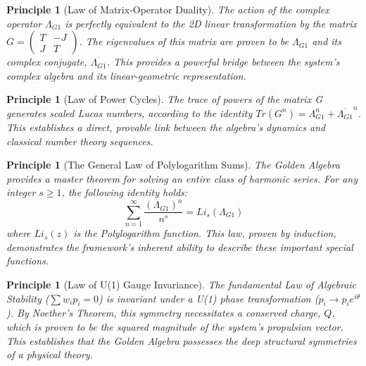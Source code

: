 \documentclass{article}
\theoremstyle{plain}
\newtheorem{principle}[theorem]{Principle}
\theoremstyle{definition}
\theoremstyle{remark}
\begin{document}
\begin{principle}[Law of Matrix-Operator Duality]
The action of the complex operator $\Lambda_{G1}$ is perfectly equivalent to the 2D linear transformation by the matrix $G = \begin{pmatrix} T & -J \\ J & T \end{pmatrix}$. The eigenvalues of this matrix are proven to be $\Lambda_{G1}$ and its complex conjugate, $\overline{\Lambda_{G1}}$. This provides a powerful bridge between the system's complex algebra and its linear-geometric representation.
\end{principle}

\begin{principle}[Law of Power Cycles]
The trace of powers of the matrix G generates scaled Lucas numbers, according to the identity $Tr(G^n) = \Lambda_{G1}^n + \overline{\Lambda_{G1}}^n$. This establishes a direct, provable link between the algebra's dynamics and classical number theory sequences.
\end{principle}

\begin{principle}[The General Law of Polylogarithm Sums]
The Golden Algebra provides a master theorem for solving an entire class of harmonic series. For any integer $s \ge 1$, the following identity holds:
$$ \sum_{n=1}^{\infty} \frac{(\Lambda_{G1})^n}{n^s} = Li_s(\Lambda_{G1}) $$
where $Li_s(z)$ is the Polylogarithm function. This law, proven by induction, demonstrates the framework's inherent ability to describe these important special functions.
\end{principle}

\begin{principle}[Law of U(1) Gauge Invariance]
The fundamental Law of Algebraic Stability ($\sum w_i p_i = 0$) is invariant under a U(1) phase transformation ($p_i \rightarrow p_i e^{i\theta}$). By Noether's Theorem, this symmetry necessitates a conserved charge, $Q$, which is proven to be the squared magnitude of the system's propulsion vector. This establishes that the Golden Algebra possesses the deep structural symmetries of a physical theory.
\end{principle}
\end{document}
